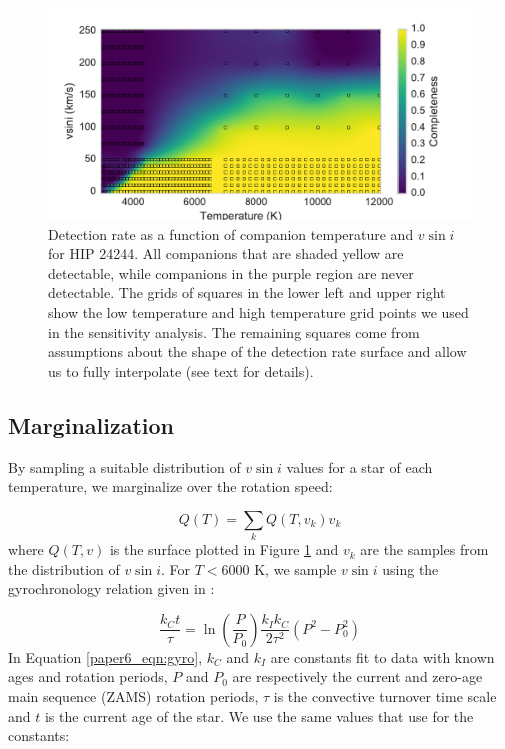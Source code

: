 \begin{figure}[t]
\includegraphics[width=\columnwidth]{Figures/paper6_HIP_24244_20130919.pdf}
\caption{Detection rate as a function of companion temperature and $v\sin{i}$ for HIP 24244. All companions that are shaded yellow are detectable, while companions in the purple region are never detectable. The grids of squares in the lower left and upper right show the low temperature and high temperature grid points we used in the sensitivity analysis. The remaining squares come from assumptions about the shape of the detection rate surface and allow us to fully interpolate (see text for details).}
\label{paper6_fig:detrate_2d}
\end{figure}

\subsection{Marginalization}
By sampling a suitable distribution of $v\sin{i}$ values for a star of each temperature, we marginalize over the rotation speed:

\begin{equation}
Q(T) = \sum_k Q(T, v_k) v_k 
\end{equation} 
where $Q(T, v)$ is the surface plotted in Figure \ref{paper6_fig:detrate_2d} and $v_k$ are the samples from the distribution of $v\sin{i}$. For $T < 6000$ K, we sample $v\sin{i}$ using the gyrochronology relation given in \citet{Barnes2010b}:

\begin{equation}
\frac{k_Ct}{\tau} = \ln\left ( \frac{P}{P_0} \right ) \frac{k_Ik_C}{2\tau^2} (P^2 - P_0^2)
\label{paper6_eqn:gyro}
\end{equation}
In Equation \ref{paper6_eqn:gyro}, $k_C$ and $k_I$ are constants fit to data with known ages and rotation periods, $P$ and $P_0$ are respectively the current and zero-age main sequence (ZAMS) rotation periods, $\tau$ is the convective turnover time scale and $t$ is the current age of the star. We use the same values that \cite{Barnes2010b} use for the constants:


